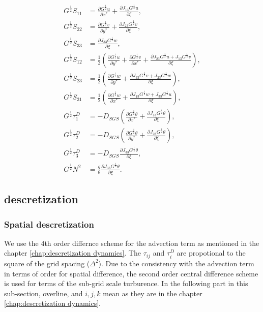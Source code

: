 \begin{align}
  G^{\frac{1}{2}}S_{11} &= \frac{\partial G^{\frac{1}{2}}u}{\partial x^*} + \frac{\partial J_{13}G^{\frac{1}{2}}u}{\partial \xi}, \\
  G^{\frac{1}{2}}S_{22} &= \frac{\partial G^{\frac{1}{2}}v}{\partial y^*} + \frac{\partial J_{23}G^{\frac{1}{2}}v}{\partial \xi}, \\
  G^{\frac{1}{2}}S_{33} &= \frac{\partial J_{33}G^{\frac{1}{2}}w}{\partial \xi}, \\
  G^{\frac{1}{2}}S_{12} &= \frac{1}{2}\left(\frac{\partial G^{\frac{1}{2}}u}{\partial y^*} + \frac{\partial G^{\frac{1}{2}}v}{\partial x^*} + \frac{\partial J_{23}G^{\frac{1}{2}}u + J_{13}G^{\frac{1}{2}}v}{\partial \xi}\right), \\
  G^{\frac{1}{2}}S_{23} &= \frac{1}{2}\left(\frac{\partial G^{\frac{1}{2}}w}{\partial y^*} + \frac{\partial J_{33}G^{\frac{1}{2}}v + J_{23}G^{\frac{1}{2}}w}{\partial \xi}\right), \\
  G^{\frac{1}{2}}S_{31} &= \frac{1}{2}\left(\frac{\partial G^{\frac{1}{2}}w}{\partial x^*} + \frac{\partial J_{13}G^{\frac{1}{2}}w + J_{33}G^{\frac{1}{2}}u}{\partial \xi}\right), \\
  G^{\frac{1}{2}}\tau^D_1 &= -D_{SGS}\left(
   \frac{\partial G^{\frac{1}{2}}\theta}{\partial x^*}
  +\frac{\partial J_{13}G^{\frac{1}{2}}\theta}{\partial \xi} \right), \\
  G^{\frac{1}{2}}\tau^D_2 &= -D_{SGS}\left(
   \frac{\partial G^{\frac{1}{2}}\theta}{\partial y^*}
  +\frac{\partial J_{23}G^{\frac{1}{2}}\theta}{\partial \xi} \right), \\
  G^{\frac{1}{2}}\tau^D_3 &= -D_{SGS}
  \frac{\partial J_{33}G^{\frac{1}{2}}\theta}{\partial \xi}, \\
  G^{\frac{1}{2}} N^2 &= \frac{g}{\theta}\frac{\partial J_{33}G^{\frac{1}{2}}\theta}{\partial \xi}.
\end{align}



\subsection{descretization}

\subsubsection{Spatial descretization}
We use the 4th order differnce scheme for the advection term as mentioned
in the chapter \ref{chap:descretization dynamics}.
The $\tau_{ij}$ and $\tau^D_{i}$ are propotional to
the square of the grid spacing ($\Delta^2$).
Due to the consistency with the advection term
in terms of order for spatial difference,
the second order central difference scheme
is used for terms of the sub-grid scale turburence.
In the following part in this sub-section,
overline, and $i,j,k$ mean
as they are in the chapter \ref{chap:descretization dynamics}.

